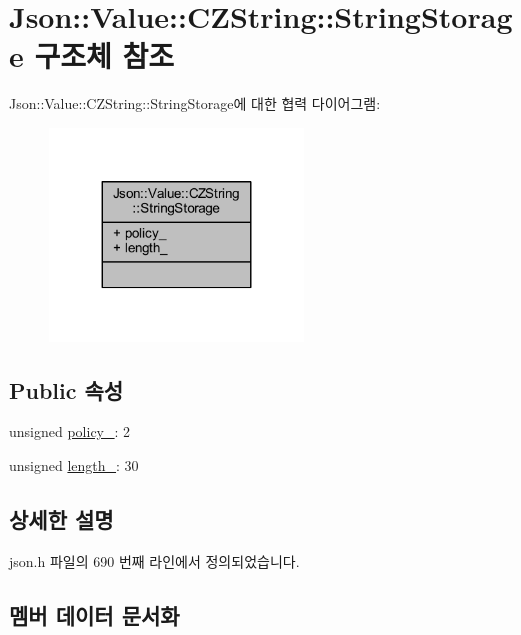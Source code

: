 \hypertarget{struct_json_1_1_value_1_1_c_z_string_1_1_string_storage}{}\section{Json\+:\+:Value\+:\+:C\+Z\+String\+:\+:String\+Storage 구조체 참조}
\label{struct_json_1_1_value_1_1_c_z_string_1_1_string_storage}


Json\+:\+:Value\+:\+:C\+Z\+String\+:\+:String\+Storage에 대한 협력 다이어그램\+:\nopagebreak
\begin{figure}[H]
\begin{center}
\leavevmode
\includegraphics[width=191pt]{struct_json_1_1_value_1_1_c_z_string_1_1_string_storage__coll__graph}
\end{center}
\end{figure}
\subsection*{Public 속성}
\begin{DoxyCompactItemize}
\item 
unsigned \hyperlink{struct_json_1_1_value_1_1_c_z_string_1_1_string_storage_a7f68c8d6197c5692a525854b5f29f87b}{policy\+\_\+}\+: 2
\item 
unsigned \hyperlink{struct_json_1_1_value_1_1_c_z_string_1_1_string_storage_a165d865c44e6471d34668eeb4f15b140}{length\+\_\+}\+: 30
\end{DoxyCompactItemize}


\subsection{상세한 설명}


json.\+h 파일의 690 번째 라인에서 정의되었습니다.



\subsection{멤버 데이터 문서화}
\mbox{\label{struct_json_1_1_value_1_1_c_z_string_1_1_string_storage_a165d865c44e6471d34668eeb4f15b140}} 
